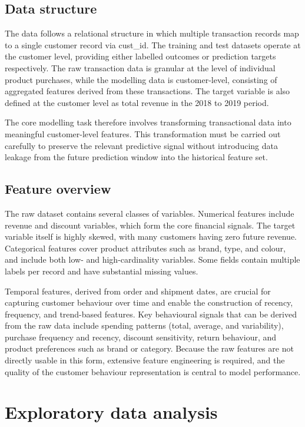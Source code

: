 \subsection{Data structure}
The data follows a relational structure in which multiple transaction records map to a single customer record via cust\_id. The training and test datasets operate at the customer level, providing either labelled outcomes or prediction targets respectively. The raw transaction data is granular at the level of individual product purchases, while the modelling data is customer-level, consisting of aggregated features derived from these transactions. The target variable is also defined at the customer level as total revenue in the 2018 to 2019 period.

The core modelling task therefore involves transforming transactional data into meaningful customer-level features. This transformation must be carried out carefully to preserve the relevant predictive signal without introducing data leakage from the future prediction window into the historical feature set.

\subsection{Feature overview}
The raw dataset contains several classes of variables. Numerical features include revenue and discount variables, which form the core financial signals. The target variable itself is highly skewed, with many customers having zero future revenue. Categorical features cover product attributes such as brand, type, and colour, and include both low- and high-cardinality variables. Some fields contain multiple labels per record and have substantial missing values.


Temporal features, derived from order and shipment dates, are crucial for capturing customer behaviour over time and enable the construction of recency, frequency, and trend-based features. Key behavioural signals that can be derived from the raw data include spending patterns (total, average, and variability), purchase frequency and recency, discount sensitivity, return behaviour, and product preferences such as brand or category. Because the raw features are not directly usable in this form, extensive feature engineering is required, and the quality of the customer behaviour representation is central to model performance.

\section{Exploratory data analysis}

